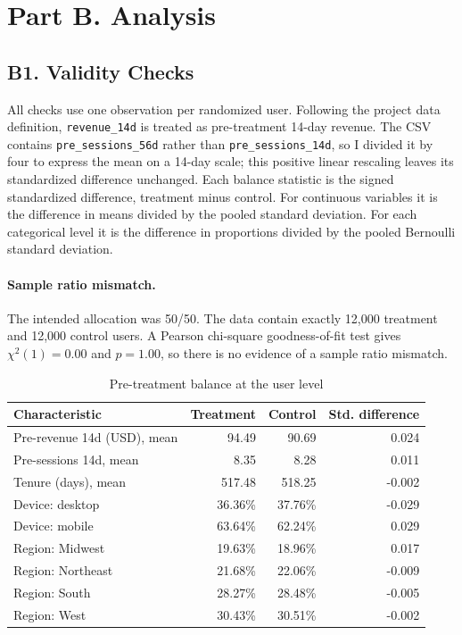 \documentclass[11pt]{article}
\begin{document}
\section*{Part B. Analysis}
\subsection*{B1. Validity Checks}

All checks use one observation per randomized user. Following the project data
definition, \texttt{revenue\_14d} is treated as pre-treatment 14-day revenue.
The CSV contains \texttt{pre\_sessions\_56d} rather than
\texttt{pre\_sessions\_14d}, so I divided it by four to express the mean on a
14-day scale; this positive linear rescaling leaves its standardized difference
unchanged. Each balance statistic is the signed standardized difference,
treatment minus control. For continuous variables it is the difference in
means divided by the pooled standard deviation. For each categorical level it
is the difference in proportions divided by the pooled Bernoulli standard
deviation.

\paragraph{Sample ratio mismatch.}
The intended allocation was 50/50. The data contain exactly 12,000 treatment
and 12,000 control users. A Pearson chi-square goodness-of-fit test gives
$\chi^2(1)=0.00$ and $p=1.00$, so there is no evidence of a sample ratio
mismatch.

\begin{table}[ht]
    \centering
    \caption{Pre-treatment balance at the user level}
    \label{tab:balance}
    \begin{tabular}{lrrr}
        \toprule
        Characteristic & Treatment & Control & Std. difference \\
        \midrule
        Pre-revenue 14d (USD), mean & 94.49 & 90.69 & 0.024 \\
        Pre-sessions 14d, mean      & 8.35  & 8.28  & 0.011 \\
        Tenure (days), mean         & 517.48 & 518.25 & -0.002 \\
        Device: desktop             & 36.36\% & 37.76\% & -0.029 \\
        Device: mobile              & 63.64\% & 62.24\% & 0.029 \\
        Region: Midwest             & 19.63\% & 18.96\% & 0.017 \\
        Region: Northeast           & 21.68\% & 22.06\% & -0.009 \\
        Region: South               & 28.27\% & 28.48\% & -0.005 \\
        Region: West                & 30.43\% & 30.51\% & -0.002 \\
        \bottomrule
    \end{tabular}
\end{table}
\end{document}
